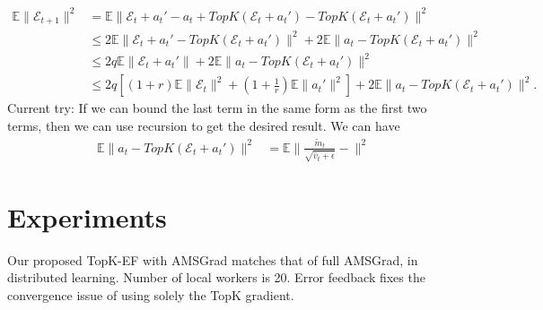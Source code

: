 \documentclass[11pt]{article}
\begin{document}
\begin{align*}
    \mathbb E\|\mathcal E_{t+1}\|^2&=\mathbb E\|\mathcal E_t+a_t'-a_t+TopK(\mathcal E_t+a_t')-TopK(\mathcal E_t+a_t')\|^2\\
    &\leq 2\mathbb E\|\mathcal E_t+a_t'-TopK(\mathcal E_t+a_t')\|^2+2\mathbb E\|a_t-TopK(\mathcal E_t+a_t')\|^2\\
    &\leq 2q\mathbb E\|\mathcal E_t+a_t'\|+2\mathbb E\|a_t-TopK(\mathcal E_t+a_t')\|^2\\
    &\leq 2q[(1+r)\mathbb E\|\mathcal E_t\|^2+(1+\frac{1}{r})\mathbb E\|a_t'\|^2]+2\mathbb E\|a_t-TopK(\mathcal E_t+a_t')\|^2.
\end{align*}
Current try: If we can bound the last term in the same form as the first two terms, then we can use recursion to get the desired result. We can have
\begin{align*}
    \mathbb E\|a_t-TopK(\mathcal E_t+a_t')\|^2&=\mathbb E\| \frac{\tilde m_t}{\sqrt{\hat v_t+\epsilon}}- \|^2
\end{align*}

\newpage
\section{Experiments}\label{sec:experiment}
Our proposed TopK-EF with AMSGrad matches that of full AMSGrad, in distributed learning. Number of local workers is 20. Error feedback fixes the convergence issue of using solely the TopK gradient. 
\end{document}
